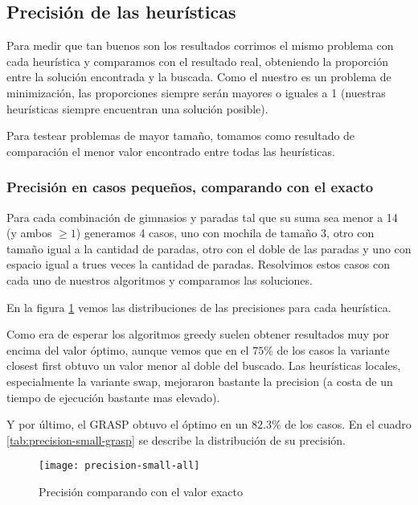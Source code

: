 \subsection{Precisión de las heurísticas}

Para medir que tan buenos son los resultados corrimos el mismo problema con cada heurística y comparamos con el resultado real,
obteniendo la proporción entre la solución encontrada y la buscada. Como el nuestro es un problema de minimización,
las proporciones siempre serán mayores o iguales a 1 (nuestras heurísticas siempre encuentran una solución posible).

Para testear problemas de mayor tamaño, tomamos como resultado de comparación el menor valor encontrado entre todas las heurísticas.

\subsubsection{Precisión en casos pequeños, comparando con el exacto}
\label{sec:precision-small}

Para cada combinación de gimnasios y paradas tal que su suma sea menor a 14 (y ambos $\geq 1$) generamos 4 casos,
uno con mochila de tamaño 3, otro con tamaño igual a la cantidad de paradas, otro con el doble de las paradas
y uno con espacio igual a trues veces la cantidad de paradas.
Resolvimos estos casos con cada uno de nuestros algoritmos y comparamos las soluciones.

En la figura \ref{fig:precision-small-all} vemos las distribuciones de las precisiones para cada heurística.

Como era de esperar los algoritmos greedy suelen obtener resultados muy por encima del valor óptimo, aunque vemos que en el $75\%$
de los casos la variante closest first obtuvo un valor menor al doble del buscado.
Las heurísticas locales, especialmente la variante swap, mejoraron bastante la precision (a costa de un tiempo de ejecución bastante mas elevado).

Y por último, el GRASP obtuvo el óptimo en un $82.3\%$ de los casos.
En el cuadro \ref{tab:precision-small-grasp} se describe la distribución de su precisión.

\begin{figure}[H]
    \centering
    \texttt{[image: precision-small-all]}
    \caption{Precisión comparando con el valor exacto}
    \label{fig:precision-small-all}
\end{figure}

